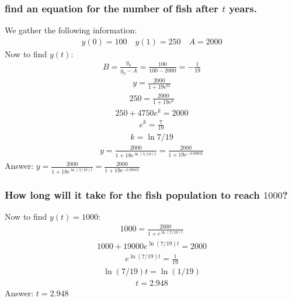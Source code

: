 \documentclass{article}
\begin{document}
\subsubsection{find an equation for the number of fish after $t$ years.}
We gather the following information:
\begin{align*}
	y(0) = 100 \quad y(1) = 250 \quad A = 2000
\end{align*}
Now to find $y(t)$:
\begin{align*}
	B = \frac{y_0}{y_0 - A} = \frac{100}{100 - 2000} = -\frac{1}{19}
\end{align*}
\begin{align*}
	y = \frac{2000}{1 + 19e^{kt}}
\end{align*}
\begin{align*}
	250 = \frac{2000}{1 + 19e^k}
\end{align*}
\begin{align*}
	250+ 4750e^k = 2000
\end{align*}
\begin{align*}
	e^k = \frac{7}{19}
\end{align*}
\begin{align*}
	k = \ln{7/19}
\end{align*}
\begin{align*}
	y = \frac{2000}{1 + 18e^{\ln{(7/19)}t}} = \frac{2000}{1 + 19e^{-0.9985t}}
\end{align*}
Answer: $y = \frac{2000}{1 + 18e^{\ln{(7/19)}t}} = \frac{2000}{1 + 19e^{-0.9985t}}$

\subsubsection{How long will it take for the fish population to reach $1000$?}
Now to find $y(t) = 1000$:
\begin{align*}
	1000 = \frac{2000}{1 + e^{\ln{(7/19)}t}}
\end{align*}
\begin{align*}
	1000 + 19000e^{\ln{(7/19)}t} = 2000
\end{align*}
\begin{align*}
	e^{\ln{(7/19)}t} = \frac{1}{19}
\end{align*}
\begin{align*}
	\ln{(7/19)}t = \ln{(1/19)}
\end{align*}
\begin{align*}
	t = 2.948
\end{align*}
Answer: $t = 2.948$
\end{document}
